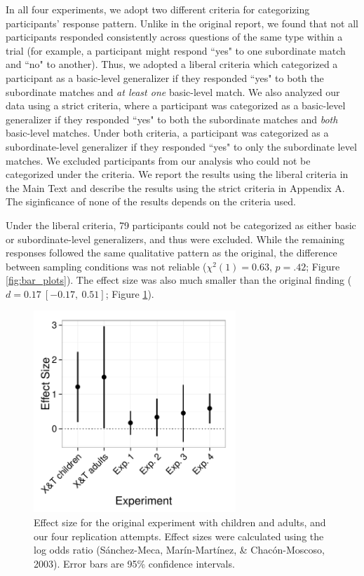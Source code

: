 \documentclass[man]{apa2}
\begin{document}
In all four experiments, we adopt two different criteria for categorizing participants' response pattern. Unlike in the original report, we found that not all participants responded consistently across questions of the same type within a trial (for example, a participant might respond ``yes" to one subordinate match and ``no" to another). Thus, we adopted a liberal criteria which categorized a participant as a basic-level generalizer if they responded ``yes" to both the subordinate matches and {\it at least one} basic-level match. We also analyzed our data using a strict criteria, where a participant was categorized as a basic-level generalizer if they responded ``yes" to both the subordinate matches and {\it both} basic-level matches.  Under both criteria, a participant was categorized as a subordinate-level generalizer if they responded ``yes" to only the subordinate level matches.  We excluded participants from our analysis who could not be categorized under the criteria. We report the results using the liberal criteria in the Main Text and describe the results using the strict criteria in Appendix A. The siginficance  of none of the results depends on the criteria used. 

Under the liberal criteria, 79 participants could not be categorized as either basic or subordinate-level generalizers, and thus were excluded. While the  remaining responses followed the same qualitative pattern as the original, the difference  between sampling conditions was not reliable ($\chi^2(1) = 0.63$,  $p = .42$; Figure \ref{fig:bar_plots}). The effect size was also much smaller than the original finding ($d = 0.17\ [-0.17,\ 0.51]$; Figure \ref{fig:effect_sizes}).

 \begin{figure} [t]
  \includegraphics[width=3in]{figures/FIG_3.pdf} 
  \caption{\label{fig:effect_sizes} Effect size for the original experiment with children and adults, and our four replication attempts.  Effect sizes were calculated using the log odds ratio (S\'{a}nchez-Meca, Mar\'{i}n-Mart\'{i}nez, \& Chac\'{o}n-Moscoso, 2003). Error bars are 95\% confidence intervals.} 
\end{figure}
\end{document}
